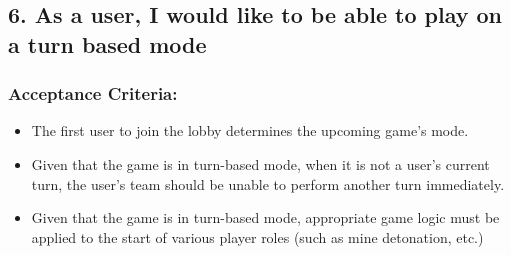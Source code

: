 \subsection*{6. As a user, I would like to be able to play on a turn based mode}


\subsubsection*{Acceptance Criteria:}

\begin{itemize}
\item The first user to join the lobby determines the upcoming game's mode.
\item Given that the game is in turn-based mode, when it is not a user's current turn, the user's team should be unable to perform another turn immediately.
\item Given that the game is in turn-based mode, appropriate game logic must be applied to the start of various player roles (such as mine detonation, etc.)
\end{itemize}

